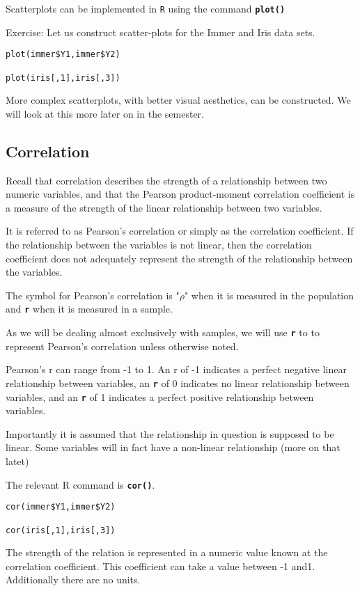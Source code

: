 \documentclass[a4paper,12pt]{article}
\begin{document}
Scatterplots can be implemented in \texttt{R} using the command \texttt{\textbf{plot()}}

Exercise: Let us construct scatter-plots for the Immer and Iris data sets.

\begin{framed}
\begin{verbatim}
plot(immer$Y1,immer$Y2)

plot(iris[,1],iris[,3])
\end{verbatim}
\end{framed}
More complex scatterplots, with better visual aesthetics, can be constructed. We will look at this more later on in the semester.

\subsection{Correlation}
Recall that correlation describes the strength of a relationship between two numeric variables, and that the Pearson product-moment correlation coefficient is a measure of the strength of the linear relationship between two variables.

It is referred to as Pearson's correlation or simply as the correlation coefficient. If the relationship between the variables is not linear, then the correlation coefficient does not adequately represent the strength of the relationship between the variables.

The symbol for Pearson's correlation is "$\rho$" when it is measured in the population and \texttt{\textbf{r}} when it is measured in a sample.

As we will be dealing almost exclusively with samples, we will use \texttt{\textbf{r}} to to represent Pearson's correlation unless otherwise noted.

Pearson's r can range from -1 to 1. An r of -1 indicates a perfect negative linear relationship between variables, an \texttt{\textbf{r}} of 0 indicates no linear relationship between variables, and an \texttt{\textbf{r}} of 1 indicates a perfect positive relationship between variables.

Importantly it is assumed that the relationship in question is supposed to be linear. Some variables will in fact have a non-linear relationship (more on that latet)

The relevant R command is \texttt{\textbf{cor()}}.


\begin{framed}
\begin{verbatim}
cor(immer$Y1,immer$Y2)

cor(iris[,1],iris[,3])
\end{verbatim}
\end{framed}
The strength of the relation is represented in a numeric value known at the correlation coefficient. This coefficient can take a value between -1 and1. Additionally there are no units.
\end{document}
